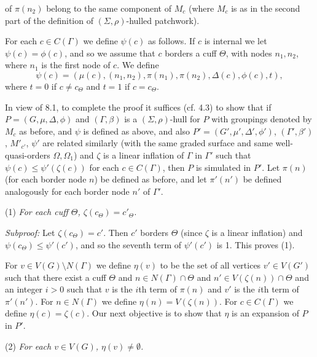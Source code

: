 \noindent of $\pi(n_2)$ belong to the same component of $M_c$ (where $M_c$ is as in the second part of the definition of $(\Sigma, \rho)$-hulled patchwork).

For each $c \in C(\Gamma)$ we define $\psi(c)$ as follows. If $c$ is internal we let $\psi(c) = \phi(c)$, and so we assume that $c$ borders a cuff $\Theta$, with nodes $n_1, n_2$, where $n_1$ is the first node of $c$. We define
\begin{equation*}
\psi(c) = (\mu(c), (n_1, n_2), \pi(n_1), \pi(n_2), \Delta(c), \phi(c), t),
\end{equation*}
where $t = 0$ if $c \ne c_\Theta$ and $t = 1$ if $c = c_\Theta$.

In view of 8.1, to complete the proof it suffices (cf. 4.3) to show that if $P = (G, \mu, \Delta, \phi)$ and $(\Gamma, \beta)$ is a $(\Sigma, \rho)$-hull for $P$ with groupings denoted by $M_c$ as before, and $\psi$ is defined as above, and also $P' = (G', \mu', \Delta', \phi')$, $(\Gamma', \beta')$, $M'_{c'}$, $\psi'$ are related similarly (with the same graded surface and same well-quasi-orders $\Omega, \Omega_1$) and $\zeta$ is a linear inflation of $\Gamma$ in $\Gamma'$ such that $\psi(c) \le \psi'(\zeta(c))$ for each $c \in C(\Gamma)$, then $P$ is simulated in $P'$. Let $\pi(n)$ (for each border node $n$) be defined as before, and let $\pi'(n')$ be defined analogously for each border node $n'$ of $\Gamma'$.

\hspace*{12pt}(1) \textit{For each cuff $\Theta$, $\zeta(c_\Theta) = c'_\Theta$.}

\textit{Subproof:} Let $\zeta(c_\Theta) = c'$. Then $c'$ borders $\Theta$ (since $\zeta$ is a linear inflation) and $\psi(c_\Theta) \le \psi'(c')$, and so the seventh term of $\psi'(c')$ is 1. This proves (1).

For $v \in V(G) \setminus N(\Gamma)$ we define $\eta(v)$ to be the set of all vertices $v' \in V(G')$ such that there exist a cuff $\Theta$ and $n \in N(\Gamma) \cap \Theta$ and $n' \in V(\zeta(n)) \cap \Theta$ and an integer $i > 0$ such that $v$ is the $i$th term of $\pi(n)$ and $v'$ is the $i$th term of $\pi'(n')$. For $n \in N(\Gamma)$ we define $\eta(n) = V(\zeta(n))$. For $c \in C(\Gamma)$ we define $\eta(c) = \zeta(c)$. Our next objective is to show that $\eta$ is an expansion of $P$ in $P'$.

\hspace*{12pt}(2) \textit{For each $v \in V(G)$, $\eta(v) \ne \emptyset$.}

